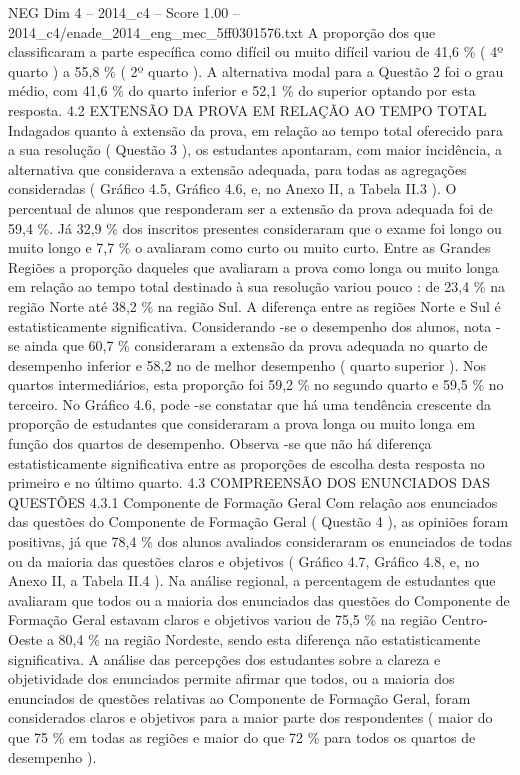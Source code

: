 \begin{textsample}{NEG Dim 4 – 2014\_c4 – Score 1.00 – 2014\_c4/enade\_2014\_eng\_mec\_5ff0301576.txt}
A proporção dos que classificaram a parte específica como difícil ou muito difícil variou de 41,6 \% ( 4º quarto ) a 55,8 \% ( 2º quarto ).
A alternativa modal para a Questão 2 foi o grau médio, com 41,6 \% do quarto inferior e 52,1 \% do superior optando por esta resposta. 4.2 EXTENSÃO DA PROVA EM RELAÇÃO AO TEMPO TOTAL Indagados quanto à extensão da prova, em relação ao tempo total oferecido para a sua resolução ( Questão 3 ), os estudantes apontaram, com maior incidência, a alternativa que considerava a extensão adequada, para todas as agregações consideradas ( Gráfico 4.5, Gráfico 4.6, e, no Anexo II, a Tabela II.3 ).
O percentual de alunos que responderam ser a extensão da prova adequada foi de 59,4 \%.
Já 32,9 \% dos inscritos presentes consideraram que o exame foi longo ou muito longo e 7,7 \% o avaliaram como curto ou muito curto.
Entre as Grandes Regiões a proporção daqueles que avaliaram a prova como longa ou muito longa em relação ao tempo total destinado à sua resolução variou pouco : de 23,4 \% na região Norte até 38,2 \% na região Sul.
A diferença entre as regiões Norte e Sul é estatisticamente significativa.
Considerando -se o desempenho dos alunos, nota -se ainda que 60,7 \% consideraram a extensão da prova adequada no quarto de desempenho inferior e 58,2 no de melhor desempenho ( quarto superior ).
Nos quartos intermediários, esta proporção foi 59,2 \% no segundo quarto e 59,5 \% no terceiro.
No Gráfico 4.6, pode -se constatar que há uma tendência crescente da proporção de estudantes que consideraram a prova longa ou muito longa em função dos quartos de desempenho.
Observa -se que não há diferença estatisticamente significativa entre as proporções de escolha desta resposta no primeiro e no último quarto. 4.3 COMPREENSÃO DOS ENUNCIADOS DAS QUESTÕES 4.3.1 Componente de Formação Geral Com relação aos enunciados das questões do Componente de Formação Geral ( Questão 4 ), as opiniões foram positivas, já que 78,4 \% dos alunos avaliados consideraram os enunciados de todas ou da maioria das questões claros e objetivos ( Gráfico 4.7, Gráfico 4.8, e, no Anexo II, a Tabela II.4 ).
Na análise regional, a percentagem de estudantes que avaliaram que todos ou a maioria dos enunciados das questões do Componente de Formação Geral estavam claros e objetivos variou de 75,5 \% na região Centro-Oeste a 80,4 \% na região Nordeste, sendo esta diferença não estatisticamente significativa.
A análise das percepções dos estudantes sobre a clareza e objetividade dos enunciados permite afirmar que todos, ou a maioria dos enunciados de questões relativas ao Componente de Formação Geral, foram considerados claros e objetivos para a maior parte dos respondentes ( maior do que 75 \% em todas as regiões e maior do que 72 \% para todos os quartos de desempenho ).

\end{textsample}
